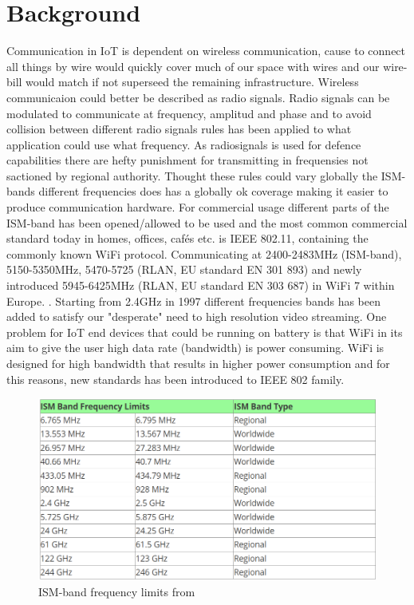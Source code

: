 \documentclass[article,a4paper]{IEEEtran}
\begin{document}
    \section{Background}
    Communication in IoT is dependent on wireless communication, cause to connect all things by wire would quickly cover much of our space with wires and our wire-bill would match if not superseed the remaining infrastructure. Wireless communicaion could better be described as radio signals. Radio signals can be modulated to communicate at frequency, amplitud and phase and to avoid collision between different radio signals rules has been applied to what application could use what frequency. As radiosignals is used for defence capabilities there are hefty punishment \cite{RFlaw} for transmitting in frequensies not sactioned by regional authority. Thought these rules could vary globally the ISM-bands different frequencies does has a globally ok coverage making it easier to produce communication hardware. For commercial usage different parts of the ISM-band has been opened/allowed to be used \cite{ISM-band1} and the most common commercial standard today in homes, offices, cafés etc. is IEEE 802.11, containing the commonly known WiFi protocol. Communicating at 2400-2483MHz (ISM-band), 5150-5350MHz, 5470-5725 (RLAN, EU standard EN 301 893) and newly introduced 5945-6425MHz (RLAN, EU standard EN 303 687) in WiFi 7 within Europe. \cite{ISM-bandEUR}. Starting from 2.4GHz in 1997 different frequencies bands has been added to satisfy our "desperate" need to high resolution video streaming. 
    \newline\newline
    One problem for IoT end devices that could be running on battery is that WiFi in its aim to give the user high data rate (bandwidth) is power consuming. WiFi is designed for high bandwidth that results in higher power consumption and for this reasons, new standards has been introduced to IEEE 802 family. 
    \newline\newline
    \begin{figure}
        \includegraphics[width=\columnwidth]{ISM-band.png} 
        \caption{ISM-band frequency limits from \cite{ISM-band1}}
        \label{fig1:ISM-band frequency limits}   
    \end{figure}
\end{document}
